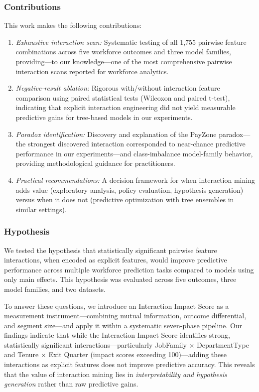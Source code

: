 \documentclass[conference]{IEEEtran}
\begin{document}
\subsubsection*{Contributions}
This work makes the following contributions:
\begin{enumerate}
    \item \textit{Exhaustive interaction scan:} Systematic testing of all 1,755 pairwise feature combinations across five workforce outcomes and three model families, providing---to our knowledge---one of the most comprehensive pairwise interaction scans reported for workforce analytics.
    \item \textit{Negative-result ablation:} Rigorous with/without interaction feature comparison using paired statistical tests (Wilcoxon and paired t-test), indicating that explicit interaction engineering did not yield measurable predictive gains for tree-based models in our experiments.
    \item \textit{Paradox identification:} Discovery and explanation of the PayZone paradox---the strongest discovered interaction corresponded to near-chance predictive performance in our experiments---and class-imbalance model-family behavior, providing methodological guidance for practitioners.
    \item \textit{Practical recommendations:} A decision framework for when interaction mining adds value (exploratory analysis, policy evaluation, hypothesis generation) versus when it does not (predictive optimization with tree ensembles in similar settings).
\end{enumerate}

\subsubsection*{Hypothesis}
We tested the hypothesis that statistically significant pairwise feature interactions, when encoded as explicit features, would improve predictive performance across multiple workforce prediction tasks compared to models using only main effects. This hypothesis was evaluated across five outcomes, three model families, and two datasets.

To answer these questions, we introduce an Interaction Impact Score as a measurement instrument---combining mutual information, outcome differential, and segment size---and apply it within a systematic seven-phase pipeline. Our findings indicate that while the Interaction Impact Score identifies strong, statistically significant interactions---particularly JobFamily $\times$ DepartmentType and Tenure $\times$ Exit Quarter (impact scores exceeding 100)---adding these interactions as explicit features does not improve predictive accuracy. This reveals that the value of interaction mining lies in \textit{interpretability and hypothesis generation} rather than raw predictive gains.
\end{document}
